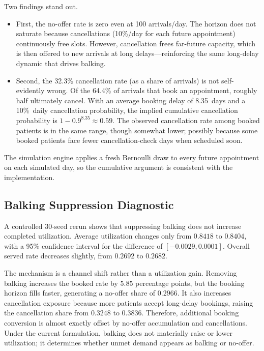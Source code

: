 \documentclass[11pt]{article}
\begin{document}
Two findings stand out. 
\begin{itemize}
    \item First, the no-offer rate is zero even at 100
arrivals/day. The horizon does not saturate because cancellations
(10\%/day for each future appointment) continuously free slots. However,
cancellation frees far-future capacity, which is then offered to new
arrivals at long delays---reinforcing the same long-delay dynamic that
drives balking.

\item Second, the 32.3\% cancellation rate (as a share of arrivals) is not
self-evidently wrong. Of the 64.4\% of arrivals that book an appointment,
roughly half ultimately cancel. With an average booking delay of 8.35~days
and a 10\%~daily cancellation probability, the implied cumulative
cancellation probability is $1 - 0.9^{8.35} \approx 0.59$. The observed
cancellation rate among booked patients is in the same range, though
somewhat lower; possibly because some booked patients face fewer
cancellation-check days when scheduled soon.
\end{itemize}

The simulation engine applies a
fresh Bernoulli draw to every future appointment on each simulated day, so the
cumulative argument is consistent with the implementation.

\subsection{Balking Suppression Diagnostic}
\label{sec:balk-suppression}

A controlled 30-seed rerun shows that suppressing balking does not increase
completed utilization. Average utilization changes only from \(0.8418\) to
\(0.8404\), with a 95\% confidence interval for the difference of
\([-0.0029,0.0001]\). Overall served rate decreases slightly, from
\(0.2692\) to \(0.2682\).

The mechanism is a channel shift rather than a utilization gain. Removing
balking increases the booked rate by \(5.85\) percentage points, but the
booking horizon fills faster, generating a no-offer share of \(0.2966\). It
also increases cancellation exposure because more patients accept long-delay
bookings, raising the cancellation share from \(0.3248\) to \(0.3836\).
Therefore, additional booking conversion is almost exactly offset by no-offer
accumulation and cancellations. Under the current formulation, balking does
not materially raise or lower utilization; it determines whether unmet demand
appears as balking or no-offer.
\end{document}
